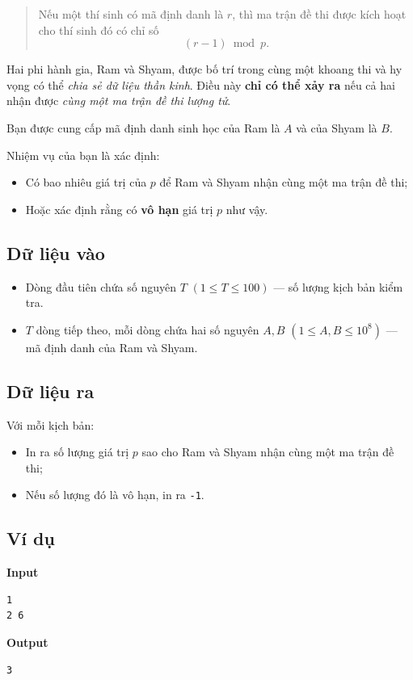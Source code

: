 \begin{quote}
    Nếu một thí sinh có mã định danh là $r$, thì ma trận đề thi được kích hoạt cho thí sinh đó có chỉ số
    \[
        (r - 1) \bmod p.
    \]
\end{quote}

Hai phi hành gia, Ram và Shyam, được bố trí trong cùng một khoang thi và hy vọng có thể \emph{chia sẻ dữ liệu thần kinh}.  
Điều này \textbf{chỉ có thể xảy ra} nếu cả hai nhận được \emph{cùng một ma trận đề thi lượng tử}.

Bạn được cung cấp mã định danh sinh học của Ram là $A$ và của Shyam là $B$.

Nhiệm vụ của bạn là xác định:
\begin{itemize}
    \item Có bao nhiêu giá trị của $p$ để Ram và Shyam nhận cùng một ma trận đề thi;
    \item Hoặc xác định rằng có \textbf{vô hạn} giá trị $p$ như vậy.
\end{itemize}

\subsection*{Dữ liệu vào}

\begin{itemize}
    \item Dòng đầu tiên chứa số nguyên $T$ $(1 \le T \le 100)$ — số lượng kịch bản kiểm tra.
    \item $T$ dòng tiếp theo, mỗi dòng chứa hai số nguyên $A, B$ $(1 \le A, B \le 10^8)$ — mã định danh của Ram và Shyam.
\end{itemize}

\subsection*{Dữ liệu ra}

Với mỗi kịch bản:
\begin{itemize}
    \item In ra số lượng giá trị $p$ sao cho Ram và Shyam nhận cùng một ma trận đề thi;
    \item Nếu số lượng đó là vô hạn, in ra \texttt{-1}.
\end{itemize}

\subsection*{Ví dụ}

\noindent
\begin{minipage}[t]{0.48\textwidth}
\textbf{Input}
\begin{verbatim}
1
2 6
\end{verbatim}
\end{minipage}
\hfill
\begin{minipage}[t]{0.48\textwidth}
\textbf{Output}
\begin{verbatim}
3
\end{verbatim}
\end{minipage}

